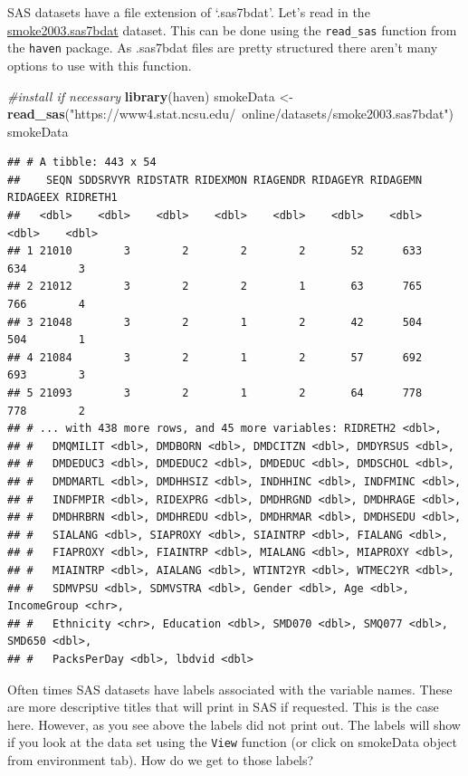 \documentclass[
]{book}
\newenvironment{Shaded}{\begin{snugshade}}{\end{snugshade}}
\newcommand{\CommentTok}[1]{\textcolor[rgb]{0.56,0.35,0.01}{\textit{#1}}}
\newcommand{\KeywordTok}[1]{\textcolor[rgb]{0.13,0.29,0.53}{\textbf{#1}}}
\newcommand{\NormalTok}[1]{#1}
\newcommand{\StringTok}[1]{\textcolor[rgb]{0.31,0.60,0.02}{#1}}
\theoremstyle{definition}
\theoremstyle{definition}
\theoremstyle{definition}
\theoremstyle{remark}
\begin{document}
SAS datasets have a file extension of `.sas7bdat'. Let's read in the \href{https://www4.stat.ncsu.edu/~online/datasets/smoke2003.sas7bdat}{smoke2003.sas7bdat} dataset. This can be done using the \texttt{read\_sas} function from the \texttt{haven} package. As .sas7bdat files are pretty structured there aren't many options to use with this function.

\begin{Shaded}
\begin{Highlighting}[]
\CommentTok{#install if necessary}
\KeywordTok{library}\NormalTok{(haven)}
\NormalTok{smokeData <-}\StringTok{ }\KeywordTok{read_sas}\NormalTok{(}\StringTok{"https://www4.stat.ncsu.edu/~online/datasets/smoke2003.sas7bdat"}\NormalTok{)}
\NormalTok{smokeData}
\end{Highlighting}
\end{Shaded}

\begin{verbatim}
## # A tibble: 443 x 54
##    SEQN SDDSRVYR RIDSTATR RIDEXMON RIAGENDR RIDAGEYR RIDAGEMN RIDAGEEX RIDRETH1
##   <dbl>    <dbl>    <dbl>    <dbl>    <dbl>    <dbl>    <dbl>    <dbl>    <dbl>
## 1 21010        3        2        2        2       52      633      634        3
## 2 21012        3        2        2        1       63      765      766        4
## 3 21048        3        2        1        2       42      504      504        1
## 4 21084        3        2        1        2       57      692      693        3
## 5 21093        3        2        1        2       64      778      778        2
## # ... with 438 more rows, and 45 more variables: RIDRETH2 <dbl>,
## #   DMQMILIT <dbl>, DMDBORN <dbl>, DMDCITZN <dbl>, DMDYRSUS <dbl>,
## #   DMDEDUC3 <dbl>, DMDEDUC2 <dbl>, DMDEDUC <dbl>, DMDSCHOL <dbl>,
## #   DMDMARTL <dbl>, DMDHHSIZ <dbl>, INDHHINC <dbl>, INDFMINC <dbl>,
## #   INDFMPIR <dbl>, RIDEXPRG <dbl>, DMDHRGND <dbl>, DMDHRAGE <dbl>,
## #   DMDHRBRN <dbl>, DMDHREDU <dbl>, DMDHRMAR <dbl>, DMDHSEDU <dbl>,
## #   SIALANG <dbl>, SIAPROXY <dbl>, SIAINTRP <dbl>, FIALANG <dbl>,
## #   FIAPROXY <dbl>, FIAINTRP <dbl>, MIALANG <dbl>, MIAPROXY <dbl>,
## #   MIAINTRP <dbl>, AIALANG <dbl>, WTINT2YR <dbl>, WTMEC2YR <dbl>,
## #   SDMVPSU <dbl>, SDMVSTRA <dbl>, Gender <dbl>, Age <dbl>, IncomeGroup <chr>,
## #   Ethnicity <chr>, Education <dbl>, SMD070 <dbl>, SMQ077 <dbl>, SMD650 <dbl>,
## #   PacksPerDay <dbl>, lbdvid <dbl>
\end{verbatim}

Often times SAS datasets have labels associated with the variable names. These are more descriptive titles that will print in SAS if requested. This is the case here. However, as you see above the labels did not print out. The labels will show if you look at the data set using the \texttt{View} function (or click on smokeData object from environment tab). How do we get to those labels?
\end{document}
